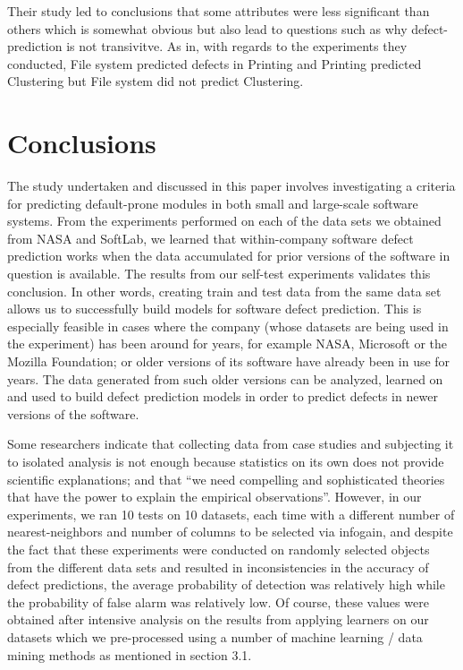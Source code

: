 \documentclass{sig-alternate}
\begin{document}
Their study led to conclusions that some attributes were less significant than others which is somewhat obvious but also lead to questions such as why defect-prediction is not transivitve. As in, with regards to the experiments they conducted, File system predicted defects in Printing and Printing predicted Clustering but File system did not predict Clustering.


\section{Conclusions}
The study undertaken and discussed in this paper involves investigating a criteria for predicting default-prone modules in both small and large-scale software systems. From the experiments performed on each of the data sets we obtained from NASA and SoftLab, we learned that within-company software defect prediction works when the data accumulated for prior versions of the software in question is available. The results from our self-test experiments validates this conclusion. In other words, creating train and test data from the same data set allows us to successfully build models for software defect prediction. This is especially feasible in cases where the company (whose datasets are being used in the experiment) has been around for years, for example NASA, Microsoft or the Mozilla Foundation; or older versions of its software have already been in use for years. The data generated from such older versions can be analyzed, learned on and used to build defect prediction models in order to predict defects in newer versions of the software.

Some researchers indicate that collecting data from case studies and subjecting it to isolated analysis is not enough because statistics on its own does not provide scientific explanations; and that ``we need compelling and sophisticated theories that have the power to explain the empirical observations''\cite{critique}. However, in our experiments, we ran 10 tests on 10 datasets, each time with a different number of nearest-neighbors and number of columns to be selected via infogain, and despite the fact that these experiments were conducted on randomly selected objects from the different data sets and resulted in inconsistencies in the accuracy of defect predictions, the average probability of detection was relatively high while the probability of false alarm was relatively low. Of course, these values were obtained after intensive analysis on the results from applying learners on our datasets which we pre-processed using a number of machine learning / data mining methods as mentioned in section 3.1.
\end{document}
